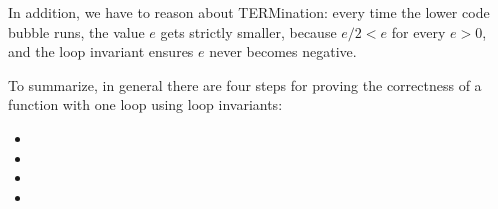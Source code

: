 In addition, we have to reason about TERMination: every time the lower
code bubble runs, the value $e$ gets strictly smaller, because $e/2 <
e$ for every $e > 0$, and the loop invariant ensures $e$ never becomes
negative.

\clearpage
To summarize, in general there are four steps for proving the
correctness of a function with one loop using loop invariants:
\begin{itemize}
\item%
\item%
\item%
\item%
\end{itemize}
